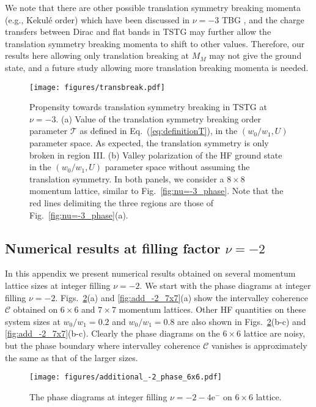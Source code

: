 \documentclass[prb,aps,nofootinbib,amssymb,twocolumn,superscriptaddress,10pt]{revtex4-2}
\begin{document}
\begin{widetext}
We note that there are other possible translation symmetry breaking momenta (e.g., Kekul\'e order) which have been discussed in $\nu=-3$ TBG \cite{XIE20a,KWAN2021}, and the charge transfers between Dirac and flat bands in TSTG may further allow the translation symmetry breaking momenta to shift to other values. Therefore, our results here allowing only translation breaking at $M_M$ may not give the ground state, and a future study allowing more translation breaking momenta is needed.

\begin{figure}
    \centering
    \texttt{[image: figures/transbreak.pdf]}
    \caption{Propensity towards translation symmetry breaking in TSTG at $\nu=-3$. (a) Value of the translation symmetry breaking order parameter $\mathcal{T}$ as defined in Eq.~(\ref{eq:definitionT}), in the $(w_0/w_1, U)$ parameter space. As expected, the translation symmetry is only broken in region III. (b) Valley polarization of the HF ground state in the $(w_0/w_1, U)$ parameter space without assuming the translation symmetry. In both panels, we consider a $8 \times 8$ momentum lattice, similar to Fig.~\ref{fig:nu=-3_phase}. Note that the red lines delimiting the three regions are those of Fig.~\ref{fig:nu=-3_phase}(a).}
    \label{app_fig:additional_nu_-3_translation}
\end{figure}

\subsection{Numerical results at filling factor \texorpdfstring{$\nu=-2$}{nu=-2}}
In this appendix we present numerical results obtained on several momentum lattice sizes at integer filling $\nu=-2$. We start with the phase diagrams at integer filling $\nu=-2$. Figs.~\ref{fig:add_-2_6x6}(a) and \ref{fig:add_-2_7x7}(a) show the intervalley coherence $\mathcal{C}$ obtained on $6\times 6$ and $7\times 7$ momentum lattices. Other HF quantities on these system sizes at $w_0/w_1 = 0.2$ and $w_0/w_1 = 0.8$ are also shown in Figs.~\ref{fig:add_-2_6x6}(b-c) and \ref{fig:add_-2_7x7}(b-c). Clearly the phase diagrams on the $6\times 6$ lattice are noisy, but the phase boundary where intervalley coherence $\mathcal{C}$ vanishes is approximately the same as that of the larger sizes.

\begin{figure}
    \centering
    \texttt{[image: figures/additional\_-2\_phase\_6x6.pdf]}
    \caption{The phase diagrams at integer filling $\nu=-2-4\mathrm{e}^-$ on $6\times 6$ lattice.}
    \label{fig:add_-2_6x6}
\end{figure}


\end{widetext}
\end{document}

